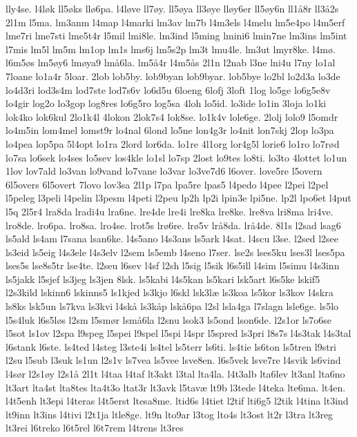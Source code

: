 {lly4se.
l4løk
ll5øks
llø6pa.
l4løve
ll7øy.
ll5øya
ll3øye
lløy6er
ll5øy6n
ll1å8r
ll3å2s
2l1m
l5ma.
lm3anm
l4map
l4marki
lm3av
lm7b
l4m3els
l4melu
lm5e4po
l4m5erf
lme7ri
lme7sti
lme5t4r
l5mil
lmi8le.
lm3ind
l5ming
lmini6
lmin7ne
lm3ins
lm5int
l7mis
lm5l
lm5m
lm1op
lm1s
lms6j
lm5s2p
lm3t
lmu4le.
lm3ut
lmyr8ke.
l4mø.
l6m5øs
lm5øy6
lmøya9
lmå6la.
lm5å4r
l4m5ås
2l1n
l2nab
l3ne
lni4u
l7ny
lo1al
7loane
lo1a4r
5loar.
2lob
lob5by.
lob9byan
lob9byar.
lob5bye
lo2bl
lo2d3a
lo3de
lo4d3ri
lod3s4m
lod7ste
lod7s6v
lo6d5u
6loeng
6lofj
3loft
1log
lo5ge
lo6g5e8v
lo4gir
log2o
lo3gop
log8res
lo6g5ro
log5sa
4loh
lo5id.
lo3ide
lo1in
3loja
lo1ki
lok4ko
lok6kul
2lo1k4l
4lokon
2lok7s4
lok8se.
lo1k4v
lole6ge.
2lolj
lolo9
l5omdr
lo4m5in
lom4mel
lomst9r
lo4nal
6lond
lo5ne
lon4g3r
lo4nit
lon7skj
2lop
lo3pa
lo4pea
lop5pa
5l4opt
lo1ra
2lord
lor6da.
lo1re
4l1org
lor4g5l
lorie6
lo1ro
lo7rød
lo7sa
lo6sek
lo4ses
lo5sev
los4kle
lo1sl
lo7sp
2lost
lo9tes
lo8ti.
lo3to
4lottet
lo1un
1lov
lov7ald
lo3van
lo9vand
lo7vane
lo3var
lo3ve7d6
l6over.
love5re
l5overn
6l5overs
6l5overt
7lovo
lov3sa
2l1p
l7pa
lpa5re
lpas5
l4pedo
l4pee
l2pei
l2pel
l5peleg
l3peli
l4pelin
l3pesm
l4peti
l2peu
lp2h
lp2i
lpin3e
lpi5ne.
lp2l
lpo6et
l4put
l5q
2l5r4
lra8da
lradi4u
lra6ne.
lre4de
lre4i
lre8ka
lre8ke.
lre8va
lri8ma
lri4ve.
lro8de.
lro6pa.
lro8sa.
lro4se.
lrot5s
lrø6re.
lrø5v
lrå8da.
lrå4de.
8l1s
l2sad
lsag6
ls5ald
ls4am
l7sana
lsan6ke.
l4s5ano
l4s3ans
ls5ark
l4sat.
l4scu
l3se.
l2sed
l2see
ls3eid
ls5eig
l4s3ele
l4s3elv
l2sem
ls5emb
l4seno
l7ser.
lse2s
lses5ku
lses3l
lses5pa
lses5s
lse8s5tr
lse4te.
l2seu
l6sev
l4sf
l2sh
l5sig
l5sik
l6s5ill
l4sim
l5simu
l4s3inn
ls5jakk
l5sjef
ls3jeg
ls3jen
8lsk.
ls5kabi
l4s5kan
ls5kari
lsk5art
l6s5ke
lskif5
l2s3kild
lskinn6
lskinns5
ls1kjed
ls3kjo
l6skl
lsk3læ
ls3koa
ls5kor
ls3kov
l4skra
ls8ks
lsk5un
ls7kva
ls3kvi
l4skå
ls3kåp
lskå6pa
l2sl
lsla4ga
l7slagn
lsle6ge.
ls5lo
l5s4luk
l6s5løs
l2sm
l5smør
lsmå6la
l2snu
lsok3
ls5ond
lson6de.
l2s1or
ls7o6se
l5sot
ls1ov
l2spa
l9speg
l5spei
l9spel
l5spi
l4spr
l5spred
ls3pri
l8s7s
l4s3tak
l4s3tal
l6stank
l6ste.
ls4ted
l4steg
l3ste4i
ls4tel
ls5terr
ls6ti.
ls4tie
ls6ton
ls5tren
l9stri
l2su
l5sub
l3suk
ls1un
l2s1v
ls7vea
ls5vee
lsve8en.
l6s5vek
lsve7re
l4svik
ls6vind
l4sør
l2s1øy
l2s1å
2l1t
l4taa
l4taf
lt3akt
l3tal
lta4la.
l4t3alb
lta6lev
lt3anl
lta6no
lt3art
lta4st
lta8tes
lta4t3o
ltat3r
lt3avk
l5tavæ
lt9b
l3tede
l4teka
lte6ma.
lt4en.
l4t5enh
lt3epi
l4teras
l4t5erst
ltesa8me.
ltid6s
l4tiet
l2tif
lti6g5
l2tik
l4tina
lt3ind
lt9inn
lt3ins
l4tivi
l2t1ja
ltle8ge.
lt9n
lto9ar
l3tog
lto4s
lt3ost
lt2r
l3tra
lt3reg
lt3rei
l6treko
l6t5rel
l6t7rem
l4trens
lt3res
}
